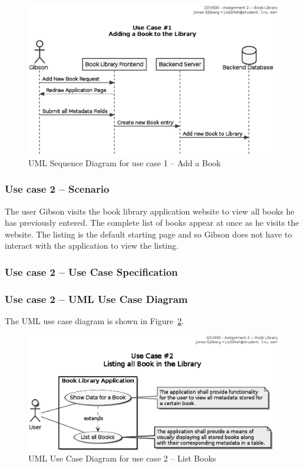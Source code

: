 \begin{figure}[htbp]
  \centering
  \includegraphics[width=\linewidth]{include/uml-use-case-1-seq.eps}
  \caption{UML Sequence Diagram for use case 1 -- Add a Book}
  \label{fig:uml-usecase1seq}
\end{figure}




\subsubsection{Use case 2 -- Scenario}\label{task-1a-usecase2}
The user Gibson visits the book library application website to view all books
he has previously entered. The complete list of books appear at once as he
visits the website. The listing is the default starting page and so Gibson does
not have to interact with the application to view the listing.


\subsubsection{Use case 2 -- Use Case Specification}\label{task-1a-usecase2spec}



\subsubsection{Use case 2 -- UML Use Case Diagram}\label{task-1a-usecase2uml}
The UML use case diagram is shown in Figure~\ref{fig:uml-usecase2}.

\begin{figure}[htbp]
  \centering
  \includegraphics[width=\linewidth]{include/uml-use-case-2.eps}
  \caption{UML Use Case Diagram for use case 2 -- List Books}
  \label{fig:uml-usecase2}
\end{figure}


